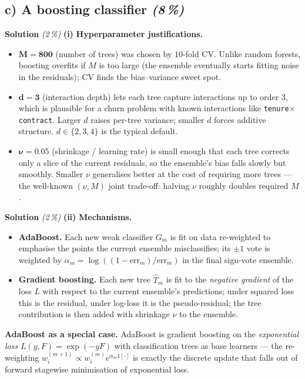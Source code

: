 \documentclass[11pt,a4paper]{article}
\newcommand{\subpoints}[1]{\textit{(#1\,\%)}}
\newcommand{\sol}{\noindent\textbf{Solution}}
\begin{document}
\subsection*{c) A boosting classifier \subpoints{8}}

\sol{} \subpoints{2} \textbf{(i)} \textbf{Hyperparameter justifications.}
\begin{itemize}
  \item $\bm{M = 800}$ (number of trees) was chosen by $10$-fold CV. Unlike random forests,
        boosting overfits if $M$ is too large (the ensemble eventually starts fitting noise in the
        residuals); CV finds the bias--variance sweet spot.
  \item $\bm{d = 3}$ (interaction depth) lets each tree capture interactions up to order $3$, which
        is plausible for a churn problem with known interactions like
        \texttt{tenure}$\times$\texttt{contract}. Larger $d$ raises per-tree variance; smaller $d$
        forces additive structure. $d \in \{2, 3, 4\}$ is the typical default.
  \item $\bm{\nu = 0.05}$ (shrinkage / learning rate) is small enough that each tree corrects only
        a slice of the current residuals, so the ensemble's bias falls slowly but smoothly. Smaller
        $\nu$ generalises better at the cost of requiring more trees --- the well-known
        $(\nu, M)$ joint trade-off: halving $\nu$ roughly doubles required $M$.
\end{itemize}

\medskip
\sol{} \subpoints{2} \textbf{(ii)} \textbf{Mechanisms.}
\begin{itemize}
  \item \textbf{AdaBoost.} Each new weak classifier $G_m$ is fit on data re-weighted to emphasise
        the points the current ensemble misclassifies; its $\pm 1$ vote is weighted by
        $\alpha_m = \log((1-\mathrm{err}_m)/\mathrm{err}_m)$ in the final sign-vote ensemble.
  \item \textbf{Gradient boosting.} Each new tree $\hat T_m$ is fit to the \emph{negative gradient}
        of the loss $L$ with respect to the current ensemble's predictions; under squared loss this
        is the residual, under log-loss it is the pseudo-residual; the tree contribution is then
        added with shrinkage $\nu$ to the ensemble.
\end{itemize}
\textbf{AdaBoost as a special case.} AdaBoost is gradient boosting on the \emph{exponential loss}
$L(y, F) = \exp(-y F)$ with classification trees as base learners --- the re-weighting
$w_i^{(m+1)} \propto w_i^{(m)} e^{\alpha_m \mathbb 1[\cdot]}$ is exactly the discrete update that
falls out of forward stagewise minimisation of exponential loss.
\end{document}
